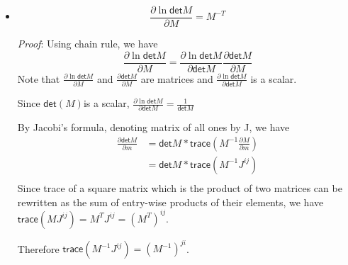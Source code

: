 \documentclass[11pt]{article}
\begin{document}
{\begin{itemize}
 \item $$\frac{\partial \ln\mathsf{det}M}{\partial M} = M^{-T}$$ 

\emph{Proof}:
Using chain rule, we have
$$\frac{\partial \ln\mathsf{det}M}{\partial M} = \frac{\partial \ln\mathsf{det}M}{\partial \mathsf{det}M}\frac{\partial \mathsf{det}M}{\partial M}$$ 
Note that $\frac{\partial \ln\mathsf{det}M}{\partial M}$ and $\frac{\partial \mathsf{det}M}{\partial M}$ are matrices and $\frac{\partial \ln\mathsf{det}M}{\partial \mathsf{det}M}$ is a scalar. 

Since $\mathsf{det}(M)$is a scalar, $\frac{\partial \ln\mathsf{det}M}{\partial \mathsf{det}M} = \frac{1}{\mathsf{det}M}$

By Jacobi's formula, denoting matrix of all ones by J, we have
\begin{equation}
    \begin{split}
        \frac{\partial \mathsf{det}M}{\partial m} &= \mathsf{det}M * \mathsf{trace}\left(M^{-1}\frac{\partial M}{\partial m}\right)\\
        &= \mathsf{det}M * \mathsf{trace}\left(M^{-1}J^{ij}\right)\\
    \end{split}
\end{equation}
Since trace of a square matrix which is the product of two matrices can be rewritten as the sum of entry-wise products of their elements, we have $\mathsf{trace}(MJ^{ij})=M^TJ^{ij}=(M^T)^{ij}$.  

Therefore $\mathsf{trace}(M^{-1}J^{ij})=(M^{-1})^{ji}$.


\end{itemize}}
\end{document}
